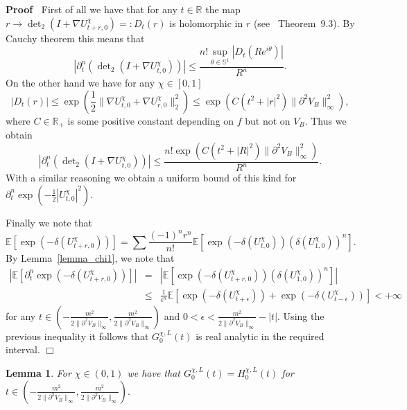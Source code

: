 \documentclass[a4paper,10pt]{article}
\newenvironment{proof}{\noindent\textbf{Proof\ }}{\hspace*{\fill}$\Box$\medskip}
\newtheorem{lemma}{Lemma}
\begin{document}
\begin{proof}
  First of all we have that for any $t \in \mathbb{R}$ the map $r \rightarrow
  \det\nolimits_2 (I + \nabla U^{\chi}_{t + r, 0}) = : D_t (r)$ is holomorphic in $r$
  (see~{\cite{Simon2005}} Theorem~9.3). By Cauchy theorem this means that
  \[ | \partial^n_t (\det\nolimits_2 (I + \nabla U^{\chi}_{t, 0})) | \leqslant
     \frac{n! \sup_{\theta \in \mathbb{S}^1} | D_t (R e^{i \theta}) |}{R^n} .
  \]
  On the other hand we have for any $\chi \in [0, 1]$
  \[ | D_t (r) | \leqslant \exp \left( \frac{1}{2} \| \nabla U^{\chi}_{t, 0} +
     \nabla U^{\chi}_{r, 0} \|^2_2 \right) \leqslant \exp (C (t^2 + | r |^2)
     \| \partial^2 V_B \|^2_{\infty}), \]
  where $C \in \mathbb{R}_+$ is some positive constant depending on $f$ but
  not on $V_B$. Thus we obtain
  \[ | \partial^n_t (\det\nolimits_2 (I + \nabla U^{\chi}_{t, 0})) | \leqslant \frac{n!
     \exp (C (t^2 + | R |^2) \| \partial^2 V_B \|^2_{\infty})}{R^n} . \]
  With a similar reasoning we obtain a uniform bound of this kind for
  $\partial^n_t \exp \left( - \frac{1}{2} | U^{\chi}_{t, 0} |^2 \right) .$
  
  Finally we note that
  \[ \mathbb{E} [\exp (- \delta (U^{\chi}_{t + r, 0}))] = \sum \frac{(- 1)^n
     r^n}{n!} \mathbb{E} [\exp (- \delta (U^{\chi}_{t, 0})) (\delta
     (U^{\chi}_{1, 0}))^n] . \]
  By Lemma~\ref{lemma_chi1}, we note that
  \begin{eqnarray}
    | \mathbb{E} [\partial^n_t \exp (- \delta (U^{\chi}_{t + r, 0}))] | & = &
    | \mathbb{E} [\exp (- \delta (U^{\chi}_{t + r, 0})) (\delta (U^{\chi}_{1,
    0}))^n] | \nonumber\\
    & \leqslant & \frac{1}{\epsilon^n} \mathbb{E} [\exp (- \delta
    (U^{\chi}_{t + \epsilon})) + \exp (- \delta (U^{\chi}_{t - \epsilon}))] <
    + \infty \nonumber
  \end{eqnarray}
  for any $t \in \left( - \frac{m^2}{2 \| \partial^2 V_B \|_{\infty}},
  \frac{m^2}{2 \| \partial^2 V_B \|_{\infty}} \right)$ and $0 < \epsilon <
  \frac{m^2}{2 \| \partial^2 V_B \|_{\infty}} - | t | .$ Using the previous
  inequality it follows that $G^{\chi, L}_0 (t)$ is real analytic in the
  required interval. 
\end{proof}

\begin{lemma}
  \label{lemma_chi3}For $\chi \in (0, 1)$ we have that $G^{\chi, L}_0 (t) =
  H^{\chi, L}_0 (t)$ for $t \in \left( - \frac{m^2}{2 \| \partial^2 V_B
  \|_{\infty}}, \frac{m^2}{2 \| \partial^2 V_B \|_{\infty}} \right) .$
\end{lemma}
\end{document}
